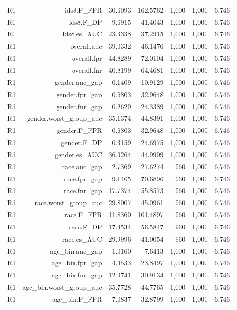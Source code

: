 \documentclass[10pt]{article}
\begin{document}
\begin{longtable}{@{}lrrrrrr@{}}
R0 & ids8.F\_FPR & 30.6093 & 162.5762 & 1,000 & 1,000 & 6,746 \\
R0 & ids8.F\_DP & 9.6915 & 41.4043 & 1,000 & 1,000 & 6,746 \\
R0 & ids8.es\_AUC & 23.3338 & 37.2915 & 1,000 & 1,000 & 6,746 \\
R1 & overall.auc & 39.0332 & 46.1476 & 1,000 & 1,000 & 6,746 \\
R1 & overall.fpr & 44.8289 & 72.0104 & 1,000 & 1,000 & 6,746 \\
R1 & overall.fnr & 40.8199 & 64.4681 & 1,000 & 1,000 & 6,746 \\
R1 & gender.auc\_gap & 0.1409 & 10.9129 & 1,000 & 1,000 & 6,746 \\
R1 & gender.fpr\_gap & 0.6803 & 32.9648 & 1,000 & 1,000 & 6,746 \\
R1 & gender.fnr\_gap & 0.2629 & 24.3389 & 1,000 & 1,000 & 6,746 \\
R1 & gender.worst\_group\_auc & 35.1374 & 44.8391 & 1,000 & 1,000 & 6,746 \\
R1 & gender.F\_FPR & 0.6803 & 32.9648 & 1,000 & 1,000 & 6,746 \\
R1 & gender.F\_DP & 0.3159 & 24.6975 & 1,000 & 1,000 & 6,746 \\
R1 & gender.es\_AUC & 36.9264 & 44.9909 & 1,000 & 1,000 & 6,746 \\
R1 & race.auc\_gap & 2.7369 & 27.6274 & 960 & 1,000 & 6,746 \\
R1 & race.fpr\_gap & 9.1465 & 70.6896 & 960 & 1,000 & 6,746 \\
R1 & race.fnr\_gap & 17.7374 & 55.8573 & 960 & 1,000 & 6,746 \\
R1 & race.worst\_group\_auc & 29.8007 & 45.0961 & 960 & 1,000 & 6,746 \\
R1 & race.F\_FPR & 11.8360 & 101.4897 & 960 & 1,000 & 6,746 \\
R1 & race.F\_DP & 17.4534 & 56.5847 & 960 & 1,000 & 6,746 \\
R1 & race.es\_AUC & 29.9996 & 41.0054 & 960 & 1,000 & 6,746 \\
R1 & age\_bin.auc\_gap & 1.0160 & 7.6413 & 1,000 & 1,000 & 6,746 \\
R1 & age\_bin.fpr\_gap & 4.4533 & 23.8497 & 1,000 & 1,000 & 6,746 \\
R1 & age\_bin.fnr\_gap & 12.9741 & 30.9134 & 1,000 & 1,000 & 6,746 \\
R1 & age\_bin.worst\_group\_auc & 35.7728 & 44.7765 & 1,000 & 1,000 & 6,746 \\
R1 & age\_bin.F\_FPR & 7.0837 & 32.8799 & 1,000 & 1,000 & 6,746 \\

\end{longtable}
\end{document}
